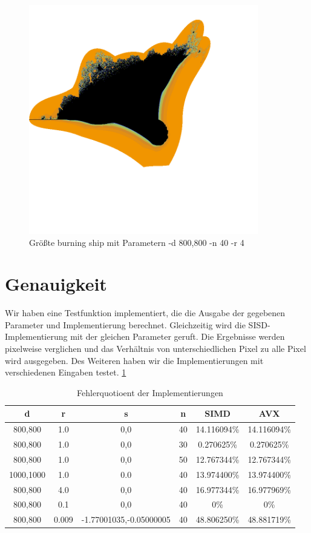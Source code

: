 \documentclass[course=erap]{aspdoc}
\begin{document}
\begin{figure}[htp]
    \centering
    \includegraphics[width=10cm]{data/bs.png}
    \caption{Größte burning ship mit Parametern -d 800,800 -n 40 -r 4}
    \label{fig:big_ship}
\end{figure}

\section{Genauigkeit}
Wir haben eine Testfunktion implementiert, die die Ausgabe der gegebenen Parameter und Implementierung berechnet. Gleichzeitig wird die SISD-Implementierung mit der gleichen Parameter geruft. Die Ergebnisse werden pixelweise verglichen und das Verhältnis von unterschiedlichen Pixel zu alle Pixel wird ausgegeben. Des Weiteren haben wir die Implementierungen mit verschiedenen Eingaben testet. \ref{tab:table_label}
\begin{table}[h]
\centering
\begin{tabular}{|c|c|c|c|c|c|}
\hline
d & r & s & n & SIMD & AVX \\ [0.5ex] 
\hline\hline
800,800 & 1.0 & 0,0 & 40 & 14.116094\% & 14.116094\% \\
800,800 & 1.0 & 0,0 & 30 &  0.270625\% &  0.270625\% \\ 
800,800 & 1.0 & 0,0 & 50 &  12.767344\% &  12.767344\% \\ 
1000,1000 & 1.0 & 0.0 & 40 & 13.974400\% & 13.974400\% \\
800,800 & 4.0 & 0,0 & 40 & 16.977344\% & 16.977969\% \\
800,800 & 0.1 & 0,0 & 40 & 0\% & 0\% \\
800,800 & 0.009 & -1.77001035,-0.05000005 & 40 & 48.806250\% & 48.881719\% \\ [1ex]
\hline
\end{tabular}
\caption{Fehlerquotioent der Implementierungen}
\label{tab:table_label}
\end{table}
\end{document}
